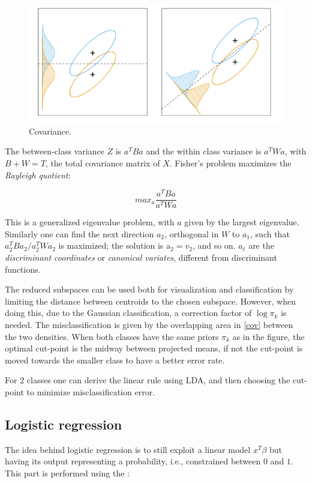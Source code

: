 \begin{figure}
\centering
\includegraphics[scale=0.4]{img/cov}
\caption{Covariance.}
\label{cov}
\end{figure}

The between-class variance $Z$ is $a^TBa$ and the within class variance is $a^TWa$, with $B+W=T$, the total covariance matrix of $X$.
Fisher's problem maximizes the \textit{Rayleigh quotient}:

\begin{equation}
max_{a} \frac{a^TBa}{a^TWa}
\end{equation}

This is a generalized eigenvalue problem, with $a$ given by the largest eigenvalue. Similarly one can find the next direction $a_2$, orthogonal in $W$ to $a_1$, such that $a^T_2 Ba_2/a^T_2 Wa_2$ is maximized; the solution is a$_2 = v_2$, and so on. $a_\ell$ are the \textit{discriminant coordinates} or \textit{canonical variates}, different from discriminant functions.

The reduced subspaces can be used both for visualization and classification by limiting the distance between centroids to the chosen subspace. However, when doing this, due to the Gaussian classification, a correction factor of $\log \pi_k$ is needed. The misclassification is given by the overlapping area in \autoref{cov} between the two densities. When both classes have the same priors $\pi_k$ as in the figure, the optimal cut-point is the midway between projected means, if not the cut-point is moved towards the smaller class to have a better error rate.

For $2$ classes one can derive the linear rule using LDA, and then choosing the cut-point to minimize misclassification error.

\subsection{Logistic regression}
\label{LogReg}
The idea behind logistic regression is to still exploit a linear model $x^T\beta$ but having its output representing a probability, i.e., constrained between $0$ and $1$. This part is performed using the :

